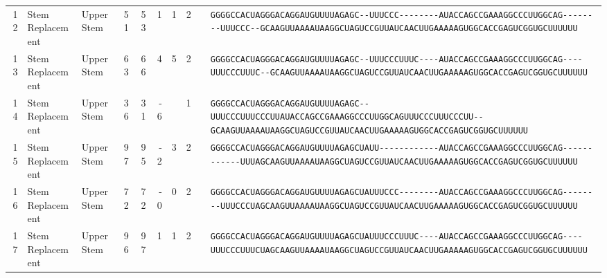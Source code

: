 \begin{tabular}{rllrrrrrcl}
 12 & Stem Replacement & Upper Stem & 51 & 53 & 1 & 1 & 2 &  &
 \color{ucsfblack}\verb|GGGGCCACUAGGGACAGGAU|\color{ucsfblue}\verb|GUUUUAGAGC--UUUCCC--------|\color{ucsfpurple}\verb|AUACCAGCCGAAAGGCCCUUGGCAG|\color{ucsfblue}\verb|--------UUUCCC--GCAAGUUAAAAU|\color{ucsfnavy}\verb|AAGGCUAGUCCGU|\color{ucsfteal}\verb|UAUCAACUUGAAAAAGUGGCACCGAGUCGGUGC|\color{ucsfblack}\verb|UUUUUU| \\

 13 & Stem Replacement & Upper Stem & 63 & 66 & 4 & 5 & 2 &  &
 \color{ucsfblack}\verb|GGGGCCACUAGGGACAGGAU|\color{ucsfblue}\verb|GUUUUAGAGC--UUUCCCUUUC----|\color{ucsfpurple}\verb|AUACCAGCCGAAAGGCCCUUGGCAG|\color{ucsfblue}\verb|----UUUCCCUUUC--GCAAGUUAAAAU|\color{ucsfnavy}\verb|AAGGCUAGUCCGU|\color{ucsfteal}\verb|UAUCAACUUGAAAAAGUGGCACCGAGUCGGUGC|\color{ucsfblack}\verb|UUUUUU| \\

 14 & Stem Replacement & Upper Stem & 36 & 31 & -6 &  & 1 &  &
 \color{ucsfblack}\verb|GGGGCCACUAGGGACAGGAU|\color{ucsfblue}\verb|GUUUUAGAGC--UUUCCCUUUCCCUU|\color{ucsfpurple}\verb|AUACCAGCCGAAAGGCCCUUGGCAG|\color{ucsfblue}\verb|UUUCCCUUUCCCUU--GCAAGUUAAAAU|\color{ucsfnavy}\verb|AAGGCUAGUCCGU|\color{ucsfteal}\verb|UAUCAACUUGAAAAAGUGGCACCGAGUCGGUGC|\color{ucsfblack}\verb|UUUUUU| \\

 15 & Stem Replacement & Upper Stem & 97 & 95 & -2 & 3 & 2 &  &
 \color{ucsfblack}\verb|GGGGCCACUAGGGACAGGAU|\color{ucsfblue}\verb|GUUUUAGAGCUAUU------------|\color{ucsfpurple}\verb|AUACCAGCCGAAAGGCCCUUGGCAG|\color{ucsfblue}\verb|------------UUUAGCAAGUUAAAAU|\color{ucsfnavy}\verb|AAGGCUAGUCCGU|\color{ucsfteal}\verb|UAUCAACUUGAAAAAGUGGCACCGAGUCGGUGC|\color{ucsfblack}\verb|UUUUUU| \\

 16 & Stem Replacement & Upper Stem & 72 & 72 & -0 & 0 & 2 &  &
 \color{ucsfblack}\verb|GGGGCCACUAGGGACAGGAU|\color{ucsfblue}\verb|GUUUUAGAGCUAUUUCCC--------|\color{ucsfpurple}\verb|AUACCAGCCGAAAGGCCCUUGGCAG|\color{ucsfblue}\verb|--------UUUCCCUAGCAAGUUAAAAU|\color{ucsfnavy}\verb|AAGGCUAGUCCGU|\color{ucsfteal}\verb|UAUCAACUUGAAAAAGUGGCACCGAGUCGGUGC|\color{ucsfblack}\verb|UUUUUU| \\

 17 & Stem Replacement & Upper Stem & 96 & 97 & 1 & 1 & 2 &  &
 \color{ucsfblack}\verb|GGGGCCACUAGGGACAGGAU|\color{ucsfblue}\verb|GUUUUAGAGCUAUUUCCCUUUC----|\color{ucsfpurple}\verb|AUACCAGCCGAAAGGCCCUUGGCAG|\color{ucsfblue}\verb|----UUUCCCUUUCUAGCAAGUUAAAAU|\color{ucsfnavy}\verb|AAGGCUAGUCCGU|\color{ucsfteal}\verb|UAUCAACUUGAAAAAGUGGCACCGAGUCGGUGC|\color{ucsfblack}\verb|UUUUUU| \\


\end{tabular}
